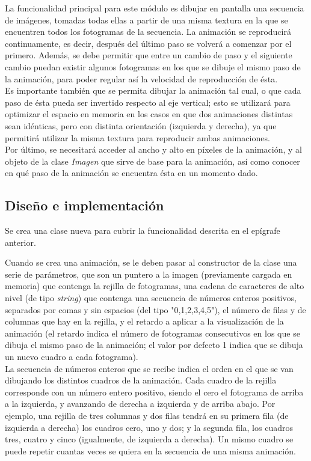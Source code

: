 La funcionalidad principal para este módulo es dibujar en pantalla una secuencia de imágenes, tomadas todas ellas a partir de una misma textura en la que se encuentren todos los fotogramas de la secuencia. La animación se reproducirá continuamente, es decir, después del último paso se volverá a comenzar por el primero. Además, se debe permitir que entre un cambio de paso y el siguiente cambio puedan existir algunos fotogramas en los que se dibuje el mismo paso de la animación, para poder regular así la velocidad de reproducción de ésta.\\

Es importante también que se permita dibujar la animación tal cual, o que cada paso de ésta pueda ser invertido respecto al eje vertical; esto se utilizará para optimizar el espacio en memoria en los casos en que dos animaciones distintas sean idénticas, pero con distinta orientación (izquierda y derecha), ya que permitirá utilizar la misma textura para reproducir ambas animaciones.\\

Por último, se necesitará acceder al ancho y alto en píxeles de la animación, y al objeto de la clase \emph{Imagen} que sirve de base para la animación, así como conocer en qué paso de la animación se encuentra ésta en un momento dado.

\subsection{Diseño e implementación}

Se crea una clase nueva para cubrir la funcionalidad descrita en el epígrafe anterior. 

Cuando se crea una animación, se le deben pasar al constructor de la clase una serie de parámetros, que son un puntero a la imagen (previamente cargada en memoria) que contenga la rejilla de fotogramas, una cadena de caracteres de alto nivel (de tipo \emph{string}) que contenga una secuencia de números enteros positivos, separados por comas y sin espacios (del tipo "0,1,2,3,4,5"), el número de filas y de columnas que hay en la rejilla, y el retardo a aplicar a la visualización de la animación (el retardo indica el número de fotogramas consecutivos en los que se dibuja el mismo paso de la animación; el valor por defecto 1 indica que se dibuja un nuevo cuadro a cada fotograma).\\

La secuencia de números enteros que se recibe indica el orden en el que se van dibujando los distintos cuadros de la animación. Cada cuadro de la rejilla corresponde con un número entero positivo, siendo el cero el fotograma de arriba a la izquierda, y avanzando de derecha a izquierda y de arriba abajo. Por ejemplo, una rejilla de tres columnas y dos filas tendrá en su primera fila (de izquierda a derecha) los cuadros cero, uno y dos; y la segunda fila, los cuadros tres, cuatro y cinco (igualmente, de izquierda a derecha). Un mismo cuadro se puede repetir cuantas veces se quiera en la secuencia de una misma animación.\\

